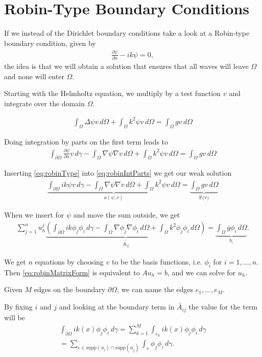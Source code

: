 \documentclass[10pt,a4paper]{article}
\begin{document}
\section*{Robin-Type Boundary Conditions}
If we instead of the Dirichlet boundary conditions take a look at a Robin-type boundary condition, given by
\begin{align}\label{eq:robinType}
\frac{\partial \psi}{\partial n} - ik\psi = 0,
\end{align}
the idea is that we will obtain a solution that ensures that all waves will leave $\Omega$ and none will enter $\Omega$.

Starting with the Helmholtz equation, we multiply by a test function $v$ and integrate over the domain $\Omega$. 

\begin{align}
\int_\Omega \Delta \psi v \, d\Omega + \int_\Omega k^2 \psi v \, d\Omega = \int_\Omega gv \, d\Omega
\end{align}

Doing integration by parts on the first term leads to
\begin{align}\label{eq:robinIntParts}
\int_{\partial \Omega} \frac{\partial \psi}{\partial n} v \, d\gamma - \int_\Omega \nabla \psi \nabla v \, d\Omega + \int_\Omega k^2 \psi v \, d\Omega = \int_\Omega gv \, d\Omega
\end{align}

Inserting \eqref{eq:robinType} into \eqref{eq:robinIntParts} we get our weak solution
\begin{align}\label{eq:robinWeakSol}
\underbrace{\int_{\partial \Omega} ik\psi v \, d\gamma - \int_\Omega \nabla \psi \nabla v \, d\Omega + \int_\Omega k^2 \psi v \, d\Omega} _\text{$a(\psi, v)$} = \underbrace{\int_\Omega gv \, d\Omega} _\text{F(v)}
\end{align}

When we insert for $\psi$ and move the sum outside, we get
\begin{align}\label{eq:robinMatrixForm}
\sum_{j=1}^n u_h^j \underbrace{\left( \int_{\partial \Omega} ik\phi_j \phi_i \, d\gamma - \int_\Omega \nabla \phi_j \nabla \phi_i \, d\Omega + \int_\Omega k^2 \phi_j \phi_i \, d\Omega \right)} _\text{$\tilde{{A_{ij}}}$} = \underbrace{\int_{\Omega} g\phi_i \, d\Omega} _\text{$b_i$}.
\end{align}

We get $n$ equations by choosing $v$ to be the basis functions, i.e. $\phi_i$ for $i = 1, \dots, n$. Then \eqref{eq:robinMatrixForm} is equivalent to $A u_h = b$, and we can solve for $u_h$.

Given $M$ edges on the boundary $\partial \Omega$, we can name the edges $e_1, \dots, e_M$. 

By fixing $i$ and $j$ and looking at the boundary term in $\tilde{A_{ij}}$ the value for the term will be
\begin{align}
\int_{\partial \Omega} ik(x)\phi_j \phi_i \, d\gamma = \sum_{k=1}^M \int_{e_k} ik(x)\phi_j \phi_i \, d\gamma\\
= \sum_{e \in \textrm{supp}(\phi_i) \cap \textrm{supp}(\phi_j)} \int_e \phi_j \phi_i \, d\gamma.
\end{align}
\end{document}
